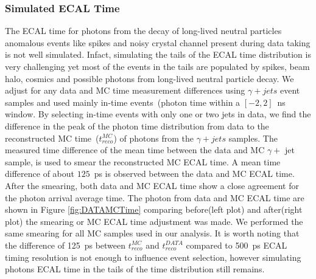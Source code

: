 \subsubsection*{Simulated ECAL Time}
The ECAL time for photons from the decay of long-lived neutral particles anomalous events like spikes and noisy crystal channel  present during data taking is not well simulated. Infact, simulating the tails of the ECAL time distribution is very challenging yet most of the events in the tails are populated by spikes, beam halo, cosmics and possible photons from long-lived neutral particle decay.
We adjust for any data and MC time measurement differences using $\gamma + jets$  event samples and used mainly in-time events~(photon time within a $[-2, 2 ]$~ns window.
By selecting in-time events with only one or two jets in data, we find the difference in the peak of the photon time distribution from data to the reconstructed MC time~($t^{MC}_{reco}$) of photons from the $\gamma + jets$ samples. The measured time difference of the mean time between the data and MC $\gamma +$ jet sample, is used to smear the reconstructed MC ECAL time. A mean time difference of about $125$~ps is observed between the data and MC ECAL time. After the smearing, both data and MC ECAL time show a close agreement for the photon arrival  average time. The photon from data and MC ECAL time are shown in Figure \ref{fig:DATAMCTime} comparing before(left plot) and after(right plot) the smearing or MC ECAL time adjustment was made. We performed the same smearing for all MC samples used in our analysis.
\newline
 It is worth noting that the difference of 125~ps between $t^{MC}_{reco}$ and $t^{DATA}_{reco}$ compared to 500~ps ECAL timing resolution is not enough to influence event selection, however simulating photons ECAL time in the tails of the time distribution still remains.

